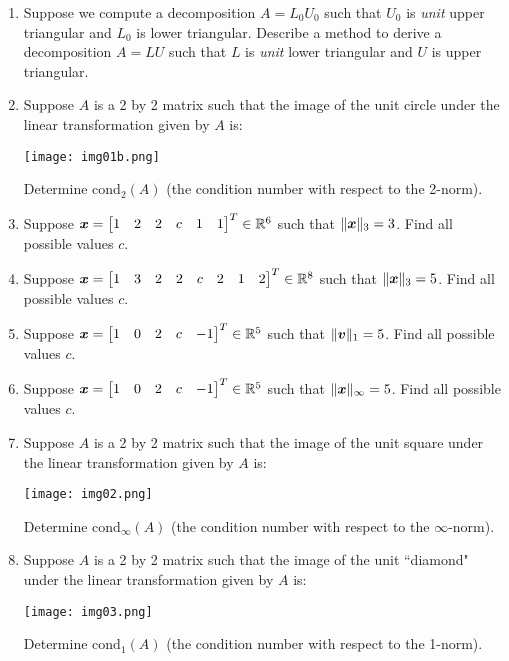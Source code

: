 \begin{enumerate}[leftmargin=*]
\item Suppose we compute a decomposition $A = L_0U_0$ such that $U_0$ is {\it unit} upper triangular and $L_0$ is lower triangular. Describe a method to derive a decomposition $A = LU$ such that $L$ is {\it unit} lower triangular and $U$ is upper triangular.

\item Suppose $A$ is a 2 by 2 matrix such that the image of the unit circle under the linear transformation given by $A$ is:
\begin{center}
\texttt{[image: img01b.png]}
\end{center}
Determine $\mathrm{cond}_2(A)$ (the condition number with respect to the 2-norm).

\item Suppose $\boldsymbol{x} = \begin{bmatrix} 1 & 2 & 2 & c & 1 & 1 \end{bmatrix}^T \in \mathbb{R}^6$ such that $\| \boldsymbol{x} \|_{3} = 3$. Find all possible values $c$.

\item Suppose $\boldsymbol{x} = \begin{bmatrix} 1 & 3 & 2 & 2 & c & 2 & 1 & 2 \end{bmatrix}^T \in \mathbb{R}^8$ such that $\| \boldsymbol{x} \|_{3} = 5$. Find all possible values $c$.

\item Suppose $\boldsymbol{x} = \begin{bmatrix} 1 & 0 & 2 & c & -1 \end{bmatrix}^T \in \mathbb{R}^5$ such that $\| \boldsymbol{v} \|_1 = 5$. Find all possible values $c$.

\item Suppose $\boldsymbol{x} = \begin{bmatrix} 1 & 0 & 2 & c & -1 \end{bmatrix}^T \in \mathbb{R}^5$ such that $\| \boldsymbol{x} \|_{\infty} = 5$. Find all possible values $c$.

\item Suppose $A$ is a 2 by 2 matrix such that the image of the unit square under the linear transformation given by $A$ is:
\begin{center}
\texttt{[image: img02.png]}
\end{center}
Determine $\mathrm{cond}_{\infty}(A)$ (the condition number with respect to the $\infty$-norm).

\item Suppose $A$ is a 2 by 2 matrix such that the image of the unit ``diamond" under the linear transformation given by $A$ is:
\begin{center}
\texttt{[image: img03.png]}
\end{center}
Determine $\mathrm{cond}_1(A)$ (the condition number with respect to the 1-norm).


\end{enumerate}
